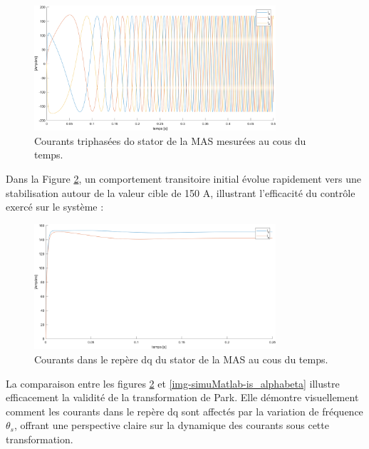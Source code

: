 \begin{figure}[!h]
    \centering
    \includegraphics[width=0.8\textwidth]{simusMATLAB/MAS/is_abc.png} 
    \caption{Courants triphasées do stator de la MAS mesurées au cous du temps.}
    \label{img-simuMatlab-is_abc}
\end{figure}

Dans la Figure \ref{img-simuMatlab-is_dq}, un comportement transitoire initial évolue rapidement vers une stabilisation autour de la valeur cible de 150 A, illustrant l'efficacité du contrôle exercé sur le système :


\begin{figure}[!h]
    \centering
    \includegraphics[width=0.8\textwidth]{simusMATLAB/MAS/is_dq.png} 
    \caption{Courants dans le repère dq du stator de la MAS au cous du temps.}
    \label{img-simuMatlab-is_dq}
\end{figure}


La comparaison entre les figures \ref{img-simuMatlab-is_dq} et \ref{img-simuMatlab-is_alphabeta} illustre efficacement la validité de la transformation de Park. Elle démontre visuellement comment les courants dans le repère dq sont affectés par la variation de fréquence \(\theta_s\), offrant une perspective claire sur la dynamique des courants sous cette transformation.


